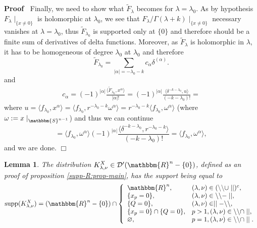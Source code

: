 \documentclass{article}
\newcommand{\assign}{:=}
\newcommand{\tmop}[1]{\ensuremath{\operatorname{#1}}}
\renewenvironment{proof}{\noindent\textbf{Proof\ }}{\hspace*{\fill}$\Box$\medskip}
\newtheorem{lemma}[proposition]{Lemma}
\theoremstyle{remark}
\begin{document}
\begin{proof}
  Finally, we need to show what $\tilde{F}_{\lambda}$ becomes for $\lambda =
  \lambda_0$. As by hypothesis $F_{\lambda} \mid_{\{ x \neq 0 \}}$ is
  holomorphic at $\lambda_0$, we see that $F_{\lambda} / \Gamma (\lambda + k)
  \mid_{\{ x \neq 0 \}}$ necessary vanishes at $\lambda = \lambda_0$, thus
  $\tilde{F}_{\lambda_0}$ is supported only at $\{ 0 \}$ and therefore should
  be a finite sum of derivatives of delta functions. Moreover, as
  $\tilde{F}_{\lambda}$ is holomorphic in $\lambda$, it has to be homogeneous
  of degree $\lambda_0$ at $\lambda_0$ and therefore
  \[ \tilde{F}_{\lambda_0} = \sum_{| \alpha | = - \lambda_0 - k} c_{\alpha}
     \delta^{(\alpha)} . \]
  and
  \begin{eqnarray}
    & c_{\alpha} = (- 1)^{| \alpha |} \frac{\langle \tilde{F}_{\lambda_0},
    x^{\alpha} \rangle}{| \alpha | !} = (- 1)^{| \alpha |} \frac{\langle
    \delta^{- k - \lambda_0}, u \rangle}{(- k - \lambda_0) !} = &  \nonumber
  \end{eqnarray}
  where $u = \langle f_{\lambda_0}, x^{\alpha} \rangle = \langle
  f_{\lambda_0}, r^{- \lambda_0 - k} \omega^{\alpha} \rangle = r^{- \lambda_0
  - k} \langle f_{\lambda_0}, \omega^{\alpha} \rangle$ (where $\omega \assign
  x \mid_{\mathbbm{S}^{n - 1}}$) and thus we can continue
  \[ = \langle f_{\lambda_0}, \omega^{\alpha} \rangle (- 1)^{| \alpha |}
     \frac{\langle \delta^{- k - \lambda_0}, r^{- \lambda_0 - k} \rangle}{(- k
     - \lambda_0) !} = \langle f_{\lambda_0}, \omega^{\alpha} \rangle, \]
  and we are done.
\end{proof}

\begin{lemma}
  \label{supp-R:lem-supp-of-K}The distribution $K_{\lambda, \nu}^X \in
  \mathcal{D}' (\mathbbm{R}^n - \{ 0 \})$, defined as an proof of proposition
  \ref{supp-R:prop-main}, has the support being equal to
  \[ \tmop{supp} (K_{\lambda, \nu}^X) = (\mathbbm{R}^n - \{ 0 \}) \cap \left\{
     \begin{array}{ll}
       \mathbbm{R}^n, & (\lambda, \nu) \in (\backslash\backslash \cup \mid
       \mid)^c,\\
       \{ x_p = 0 \}, & (\lambda, \nu) \in \backslash\backslash - \mid \mid,\\
       \{ Q = 0 \}, & (\lambda, \nu) \in \mid \mid -\backslash\backslash,\\
       \{ x_p = 0 \} \cap \{ Q = 0 \}, & p > 1, (\lambda, \nu) \in
       \backslash\backslash \cap \mid \mid,\\
       \varnothing, & p = 1, (\lambda, \nu) \in \backslash\backslash \cap \mid
       \mid .
     \end{array} \right. \]
\end{lemma}
\end{document}
